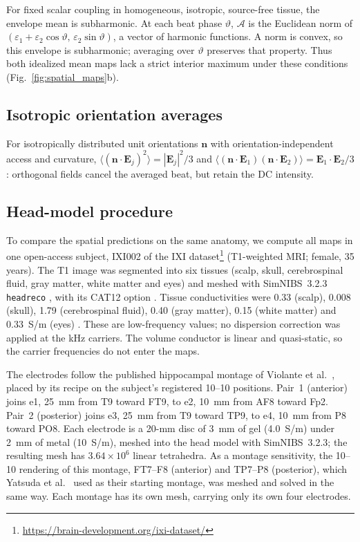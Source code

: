 \documentclass[11pt,a4paper]{article}
\newif\ifjne
\providecommand{\DIFaddtex}[1]{{\protect\color{blue} \sf #1}} %
\providecommand{\DIFaddend}{} %
\providecommand{\DIFadd}[1]{\texorpdfstring{\DIFaddtex{#1}}{#1}} %
\begin{document}
\DIFadd{For fixed scalar coupling in homogeneous, isotropic, source-free tissue,
the envelope mean is subharmonic}\DIFaddend . At each beat phase $\vartheta$,
$\mathcal A$ is the Euclidean norm of
$(\varepsilon_1+\varepsilon_2\cos\vartheta,\,\varepsilon_2\sin\vartheta)$,
a vector of harmonic functions. A norm is convex, so this envelope is subharmonic;
averaging over $\vartheta$ preserves that property. Thus both idealized mean maps
lack a strict interior maximum under these conditions (Fig.~\ref{fig:spatial_maps}b).

\subsection{Isotropic orientation averages}\label{supp:orientation}
For isotropically distributed unit orientations
$\mathbf n$ with orientation-independent access and curvature,
$\langle(\mathbf n\cdot\mathbf E_j)^2\rangle=|\mathbf E_j|^2/3$
and $\langle(\mathbf n\cdot\mathbf E_1)(\mathbf n\cdot\mathbf E_2)\rangle
=\mathbf E_1\cdot\mathbf E_2/3$: orthogonal fields cancel the averaged beat,
but retain the DC intensity.

\fi
\ifjne
\subsection{Head-model procedure}\label{supp:fem-protocol}
To compare the spatial predictions on the same anatomy, we compute all maps
in one open-access subject,
IXI002 of the IXI dataset\footnote{\url{https://brain-development.org/ixi-dataset/}}
(T1-weighted MRI; female, 35 years). The T1 image was segmented into six tissues
(scalp, skull, cerebrospinal fluid, gray matter, white matter and eyes) and meshed with
SimNIBS~3.2.3 \texttt{headreco} \cite{nielsen2018}, with its CAT12 option
\cite{gaser2024}. Tissue conductivities were 0.33 (scalp), 0.008 (skull), 1.79
(cerebrospinal fluid), 0.40 (gray matter), 0.15 (white matter) and 0.33~S/m (eyes)
\cite{salvador2025}. These are low-frequency values; no dispersion correction was
applied at the kHz carriers. The volume conductor is linear and quasi-static, so the
carrier frequencies do not enter the maps.

The electrodes follow the published hippocampal montage of Violante et al.\
\cite{violante2023}, placed by its recipe on the subject's registered 10--10
positions. Pair~1 (anterior) joins e1, 25~mm from T9 toward FT9, to e2, 10~mm from AF8
toward Fp2. Pair~2 (posterior) joins e3, 25~mm from T9 toward TP9, to e4, 10~mm from P8
toward PO8. Each electrode is a 20-mm disc of 3~mm of gel (4.0~S/m) under 2~mm of metal
(10~S/m), meshed into the head model with SimNIBS~3.2.3; the resulting mesh has
$3.64\times10^6$ linear tetrahedra. As a montage sensitivity, the 10--10 rendering of
this montage, FT7--F8 (anterior) and TP7--P8 (posterior), which Yatsuda et al.\
\cite{yatsuda2024} used as their starting montage, was meshed and solved in the same
way. Each montage has its own mesh, carrying only its own four electrodes.
\end{document}

